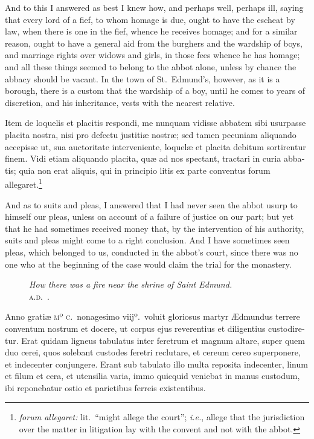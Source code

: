 \documentclass[10pt]{book}
\newcommand{\blockhead}[4][]{
\begin{figure}
\centering
\vspace{#4}
\parbox{2.75cm}{\begin{center}\footnotesize \color{BrickRed} \emph{#2}\\ #1 \end{center}}
\end{figure}
}
\begin{document}
\begin{paracol}{2}
\switchcolumn

And to this I answered as best I knew how, and perhaps well, perhaps ill, saying that every lord of a fief, to whom homage is due, ought to have the escheat by law, when there is one in the fief, whence he receives homage; and for a similar reason, ought to have a general aid from the burghers and the wardship of boys, and marriage rights over widows and girls, in those fees whence he has homage; and all these things seemed to belong to the abbot alone, unless by chance the abbacy should be vacant. In the town of St.\ Edmund's, however, as it is a borough, there is a custom that the wardship of a boy, until he comes to years of discretion, and his inheritance, vests with the nearest relative.

\switchcolumn*

\begin{otherlanguage}{latin}
Item de loquelis et placitis respondi, me nunquam vidisse abbatem sibi usurpasse placita nostra, nisi pro defectu justiti\ae{} nostr\ae{}; sed tamen pecuniam aliquando accepisse ut, sua auctoritate interveniente, loquel\ae{} et placita debitum sortirentur finem. Vidi etiam aliquando placita, qu\ae{} ad nos spectant, tractari in curia abbatis; quia non erat aliquis, qui in principio litis ex parte conventus forum allegaret.\footnote[\textdagger]{\emph{forum allegaret:} lit.\ ``might allege the court''; \emph{i.e.}, allege that the jurisdiction over the matter in litigation lay with the convent and not with the abbot.}
\end{otherlanguage}

\switchcolumn

And as to suits and pleas, I answered that I had never seen the abbot usurp to himself our pleas, unless on account of a failure of justice on our part; but yet that he had sometimes received money that, by the intervention of his authority, suits and pleas might come to a right conclusion. And I have sometimes seen pleas, which belonged to us, conducted in the abbot's court, since there was no one who at the beginning of the case would claim the trial for the monastery.

\switchcolumn*

\begin{otherlanguage}{latin}
\blockhead[\textsc{a.d}.\ .]{How there was a fire near the shrine of Saint Edmund.}{4}{-.55cm}
Anno grati\ae{} \textsc{mº c}.\ nonagesimo viijº.\ voluit gloriosus martyr \AE{}dmundus terrere conventum nostrum et docere, ut corpus ejus reverentius et diligentius custodiretur. Erat quidam ligneus tabulatus inter feretrum et magnum altare, super quem duo cerei, quos solebant custodes feretri reclutare, et cereum cereo superponere, et indecenter conjungere. Erant sub tabulato illo multa reposita indecenter, linum et filum et cera, et utensilia varia, immo quicquid veniebat in manus custodum, ibi reponebatur ostio et parietibus ferreis existentibus.


\end{otherlanguage}
\end{paracol}
\end{document}
